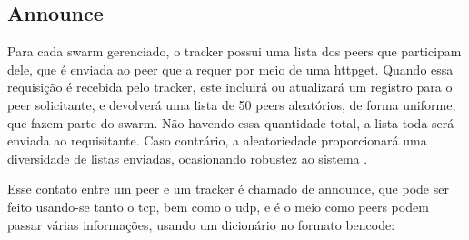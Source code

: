 
\subsection*{Announce}

Para cada \gls*{swarm} gerenciado, o \gls*{tracker} possui uma lista dos \glspl*{peer}
que participam dele, que é enviada ao \gls*{peer} que a requer por meio de uma
\gls{httpget}. Quando essa requisição é recebida pelo \gls*{tracker}, este incluirá ou
atualizará um registro para o \gls*{peer} solicitante, e devolverá uma lista de 50
\glspl*{peer} aleatórios, de forma uniforme, que fazem parte do \gls*{swarm}. Não
havendo essa quantidade total, a lista toda será enviada ao requisitante. Caso
contrário, a aleatoriedade proporcionará uma diversidade de listas enviadas,
ocasionando robustez ao sistema \cite{wikitheory:tracker-response}.

Esse contato entre um \gls*{peer} e um \gls*{tracker} é chamado de \gls{announce}, que
pode ser feito usando-se tanto o \gls{tcp}, bem como o \gls{udp}, e é o meio como
\glspl*{peer} podem passar várias informações, usando um dicionário no formato
\gls*{bencode}:

